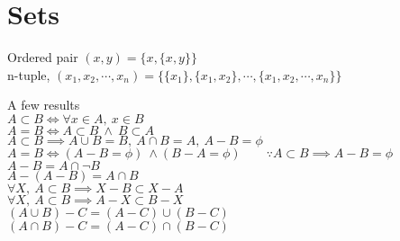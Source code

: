
\section{Sets}
	\begin{definition}
		Ordered pair $(x,y) = \{ x,\{x,y\} \}$\\
		n-tuple, $(x_1, x_2, \cdots, x_n) = \{ \{x_1\}, \{x_1, x_2\}, \cdots,\{x_1, x_2, \cdots, x_n\}\}$
	\end{definition}
	\begin{remark}A few results\\
		$A \subset B \iff \forall x \in A,\ x \in B$\\
		$A = B \iff A \subset B \ \wedge \ B \subset A$\\
		$A \subset B \implies A \cup B = B,\ A \cap B = A,\ A-B = \phi$\\
		$A = B \iff (A-B=\phi) \ \wedge (B-A=\phi) \qquad \because A \subset B \implies A-B=\phi$\\
		$A-B = A \cap \neg B$\\
		$A-(A-B) = A \cap B$\\
		$\forall X,\ A \subset B \implies X-B \subset X-A$\\
		$\forall X,\ A \subset B \implies A-X \subset B-X$\\
		$(A \cup B) - C = (A-C) \cup (B-C)$\\
		$(A \cap B) - C = (A-C) \cap (B-C)$
	\end{remark}
